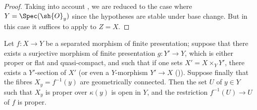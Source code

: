 \begin{proof}
Taking into account , we are reduced to the case where $Y=\Spec(\sh{O}_y)$ since the hypotheses are stable under base change.
But in this case it suffices to apply  to $Z=X$.
\end{proof}

\begin{corollary}[15.7.11]
\label{IV.15.7.11}
Let $f:X\to Y$ be a separated morphism of finite presentation; suppose that there exists a surjective morphism of finite presentation $g:Y'\to Y$, which is either proper or flat and quasi-compact, and such that if one sets $X'=X\times_Y Y'$, there exists a $Y'$-section of $X'$ (or even a $Y$-morphism $Y'\to X$ ()).
Suppose finally that the fibres $X_y=f^{-1}(y)$ are geometrically connected.
Then the set $U$ of $y\in Y$ such that $X_y$ is proper over $\kappa(y)$ is open in $Y$, and the restriction $f^{-1}(U)\to U$ of $f$ is proper.
\end{corollary}

